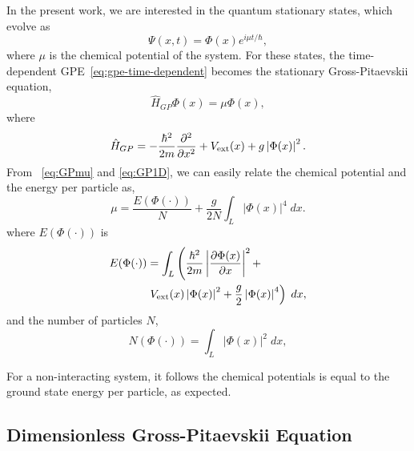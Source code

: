 \documentclass[twocolumn,showpacs,showkeys,preprintnumbers,superscriptaddress, pra, 10pt, aps]{revtex4-2}
\begin{document}
In the present work, we are interested in the quantum stationary states, which evolve as
%
\begin{equation}
  \label{eq:stationary-states}
  \Psi(x, t) = \Phi(x) e^{i \mu t /\hbar},
\end{equation}
%
where $\mu$ is the chemical potential of the system. For these states, the time-dependent
GPE~\eqref{eq:gpe-time-dependent} becomes the stationary Gross-Pitaevskii equation,
%
\begin{equation}
  \label{eq:GPmu}
  \hat{H}_{GP} \Phi(x) = \mu \Phi(x),
\end{equation}
%
where
%
\begin{equation}
  \label{eq:GP1D}
  \hat{H}_{GP} = -\frac{\hbar^2}{2m} \frac{\partial^2}{\partial x^2} + V_\mathrm{ext}(x)+ g \left| \Phi(x) \right|^2.
\end{equation}
%
From~ \eqref{eq:GPmu} and \eqref{eq:GP1D}, we can easily relate the chemical potential and the energy per particle as,
%
\begin{equation}
  \mu = \frac{E(\Phi(\cdot))}{N} + \frac{g}{2N} \int_L \left|\Phi(x) \right|^4 \; dx.
\end{equation}
%
where $E(\Phi(\cdot))$ is
\begin{align}
  E(\Phi(\cdot)) & = \int_L \left( \frac{\hbar^2}{2m} \left|\frac{\partial \Phi(x)}{\partial x} \right|^2 + \right. \nonumber \\
                 & \left. V_\mathrm{ext}(x)\left|\Phi(x)\right|^2 + \frac{g}{2}\left|\Phi(x) \right|^4 \right) \; dx,
  \label{eq:system-energy2}
\end{align}
%
and the number of particles $N$,
%
\begin{equation}
  \label{eq:norm-cond-wf2}
  N(\Phi(\cdot)) = \int_L \left| \Phi(x) \right|^2 \; dx,
\end{equation}

For a non-interacting system, it follows the chemical potentials is equal to the ground state energy per
particle, as expected.



\subsection{Dimensionless Gross-Pitaevskii Equation}
\end{document}
